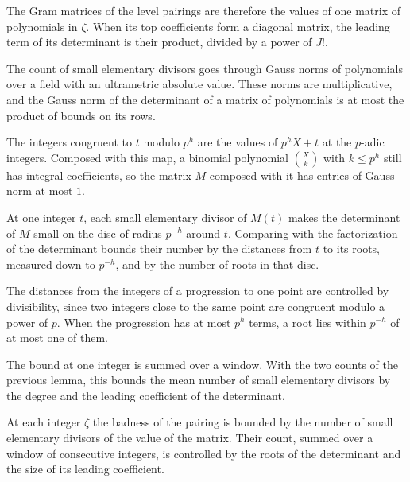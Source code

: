 The Gram matrices of the level pairings are therefore the values of one matrix of polynomials in $\zeta$. When its
top coefficients form a diagonal matrix, the leading term of its determinant is their product, divided by a power
of $J!$.

The count of small elementary divisors goes through Gauss norms of polynomials over a field with an ultrametric
absolute value. These norms are multiplicative, and the Gauss norm of the determinant of a matrix of polynomials is
at most the product of bounds on its rows.

The integers congruent to $t$ modulo $p^h$ are the values of $p^hX+t$ at the $p$-adic integers. Composed with this
map, a binomial polynomial $\binom Xk$ with $k\leq p^h$ still has integral coefficients, so the matrix $M$ composed
with it has entries of Gauss norm at most $1$.

At one integer $t$, each small elementary divisor of $M(t)$ makes the determinant of $M$ small on the disc of
radius $p^{-h}$ around $t$. Comparing with the factorization of the determinant bounds their number by the
distances from $t$ to its roots, measured down to $p^{-h}$, and by the number of roots in that disc.

The distances from the integers of a progression to one point are controlled by divisibility, since two
integers close to the same point are congruent modulo a power of $p$. When the progression has at most $p^h$
terms, a root lies within $p^{-h}$ of at most one of them.

The bound at one integer is summed over a window. With the two counts of the previous lemma, this bounds the mean
number of small elementary divisors by the degree and the leading coefficient of the determinant.

At each integer $\zeta$ the badness of the pairing is bounded by the number of small elementary divisors of the
value of the matrix. Their count, summed over a window of consecutive integers, is controlled by the roots of
the determinant and the size of its leading coefficient.

